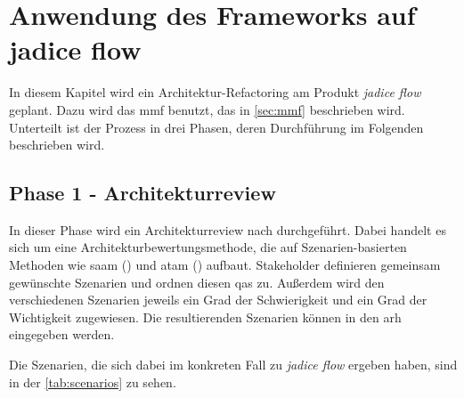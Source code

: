 \chapter{Anwendung des Frameworks auf jadice flow}
\label{chap:anwendung}

In diesem Kapitel wird ein Architektur-Refactoring am Produkt \emph{jadice flow} geplant.
Dazu wird das \gls{mmf} benutzt, das in \cref{sec:mmf} beschrieben wird.
Unterteilt ist der Prozess in drei Phasen, deren Durchführung im Folgenden beschrieben wird.

\section{Phase 1 - Architekturreview}

In dieser Phase wird ein Architekturreview nach  durchgeführt.
Dabei handelt es sich um eine Architekturbewertungsmethode, die auf Szenarien-basierten Methoden wie \gls{saam} () und \gls{atam} () aufbaut.
Stakeholder definieren gemeinsam gewünschte Szenarien und ordnen diesen \glspl{qa} zu.
Außerdem wird den verschiedenen Szenarien jeweils ein Grad der Schwierigkeit und ein Grad der Wichtigkeit zugewiesen.
Die resultierenden Szenarien können in den \gls{arh} eingegeben werden.

Die Szenarien, die sich dabei im konkreten Fall zu \emph{jadice flow} ergeben haben, sind in der \cref{tab:scenarios} zu sehen.

